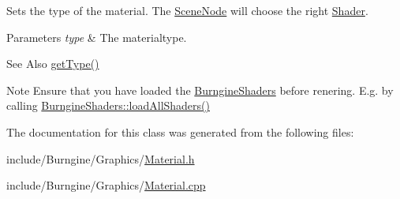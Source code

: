 Sets the type of the material. The \hyperlink{classburn_1_1_scene_node}{Scene\-Node} will choose the right \hyperlink{classburn_1_1_shader}{Shader}. 


\begin{DoxyParams}{Parameters}
{\em type} & The materialtype.\\
\hline
\end{DoxyParams}
\begin{DoxySeeAlso}{See Also}
\hyperlink{classburn_1_1_material_a46b4ee518276ce465566b0fe8fdc169a}{get\-Type()}
\end{DoxySeeAlso}
\begin{DoxyNote}{Note}
Ensure that you have loaded the \hyperlink{structburn_1_1_burngine_shaders}{Burngine\-Shaders} before renering. E.\-g. by calling \hyperlink{structburn_1_1_burngine_shaders_a33e19e46e7bc1b6d18f05d2ee233dc50}{Burngine\-Shaders\-::load\-All\-Shaders()} 
\end{DoxyNote}


The documentation for this class was generated from the following files\-:\begin{DoxyCompactItemize}
\item 
include/\-Burngine/\-Graphics/\hyperlink{_material_8h}{Material.\-h}\item 
include/\-Burngine/\-Graphics/\hyperlink{_material_8cpp}{Material.\-cpp}\end{DoxyCompactItemize}

